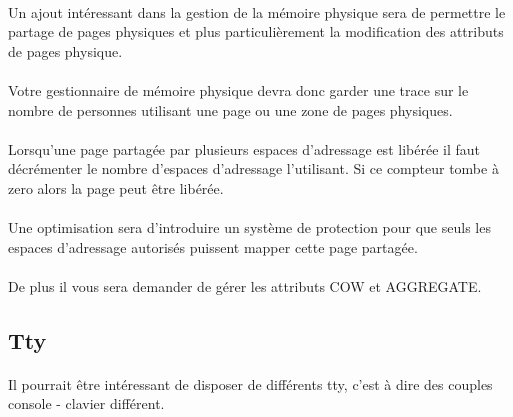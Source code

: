 \documentclass[10pt,a4wide]{article}
\begin{document}
\paragraph{}

Un ajout int\'eressant dans la gestion de la m\'emoire physique sera
de permettre le partage de pages physiques et plus particuli\`erement
la modification des attributs de pages physique.

\paragraph{}

Votre gestionnaire de m\'emoire physique devra donc garder une trace sur
le nombre de personnes utilisant une page ou une zone de pages physiques.

\paragraph{}

Lorsqu'une page partag\'ee par plusieurs espaces d'adressage est lib\'er\'ee
il faut d\'ecr\'ementer le nombre d'espaces d'adressage l'utilisant. Si ce
compteur tombe \`a zero alors la page peut \^etre lib\'er\'ee.

\paragraph{}

Une optimisation sera d'introduire un syst\`eme de protection pour que
seuls les espaces d'adressage autoris\'es puissent mapper cette page
partag\'ee.

\paragraph{}

De plus il vous sera demander de g\'erer les attributs COW et AGGREGATE.

\subsection{Tty}

\paragraph{}

Il pourrait \^etre int\'eressant de disposer de diff\'erents tty, c'est \`a
dire des couples console - clavier diff\'erent.
\end{document}
